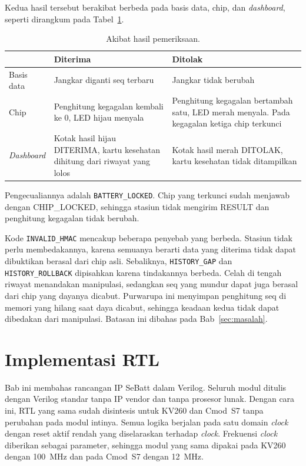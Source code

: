 \documentclass[11pt,a4paper]{article}
\begin{document}
Kedua hasil tersebut berakibat berbeda pada basis data, chip, dan \textit{dashboard}, seperti
dirangkum pada Tabel~\ref{tab:akibat}.

\begin{table}[H]
  \centering
  \small
  \begin{tabularx}{\textwidth}{l X X}
    \toprule
     & Diterima & Ditolak \\
    \midrule
    Basis data & Jangkar diganti seq terbaru & Jangkar tidak berubah \\
    Chip & Penghitung kegagalan kembali ke 0, LED hijau menyala & Penghitung kegagalan bertambah
      satu, LED merah menyala. Pada kegagalan ketiga chip terkunci \\
    \textit{Dashboard} & Kotak hasil hijau DITERIMA, kartu kesehatan dihitung dari riwayat yang
      lolos & Kotak hasil merah DITOLAK, kartu kesehatan tidak ditampilkan \\
    \bottomrule
  \end{tabularx}
  \caption{Akibat hasil pemeriksaan.}
  \label{tab:akibat}
\end{table}

Pengecualiannya adalah \texttt{BATTERY\_LOCKED}. Chip yang terkunci sudah menjawab dengan
CHIP\_LOCKED, sehingga stasiun tidak mengirim RESULT dan penghitung kegagalan tidak berubah.

Kode \texttt{INVALID\_HMAC} mencakup beberapa penyebab yang berbeda. Stasiun tidak perlu
membedakannya, karena semuanya berarti data yang diterima tidak dapat dibuktikan berasal dari chip
asli. Sebaliknya, \texttt{HISTORY\_GAP} dan \texttt{HISTORY\_ROLLBACK} dipisahkan karena
tindakannya berbeda. Celah di tengah riwayat menandakan manipulasi, sedangkan seq yang mundur
dapat juga berasal dari chip yang dayanya dicabut. Purwarupa ini menyimpan penghitung seq di
memori yang hilang saat daya dicabut, sehingga keadaan kedua tidak dapat dibedakan dari
manipulasi. Batasan ini dibahas pada Bab~\ref{sec:masalah}.

\section{Implementasi RTL}
\label{sec:rtl}

Bab ini membahas rancangan IP SeBatt dalam Verilog. Seluruh modul ditulis dengan Verilog standar
tanpa IP vendor dan tanpa prosesor lunak. Dengan cara ini, RTL yang sama sudah disintesis untuk
KV260 dan Cmod~S7 tanpa perubahan pada modul intinya. Semua logika berjalan pada satu domain \textit{clock} dengan reset
aktif rendah yang diselaraskan terhadap \textit{clock}. Frekuensi \textit{clock} diberikan sebagai
parameter, sehingga modul yang sama dipakai pada KV260 dengan 100~MHz dan pada Cmod~S7 dengan
12~MHz.
\end{document}
